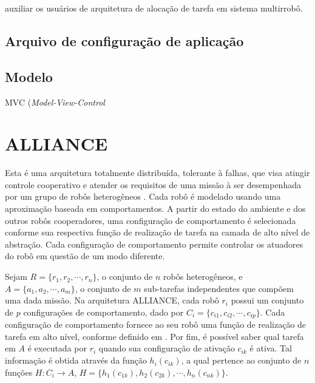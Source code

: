         auxiliar os usuários de arquitetura de alocação de tarefa em sistema multirrobô. 
        
        \subsection{Arquivo de configuração de aplicação}
        
        \subsection{Modelo}
        
        MVC (\textit{Model-View-Control}
    
        
        
        
        
        
        
        
        
        
        
        
        
        
        
        
    \section{ALLIANCE} \label{sec:alliance}
        Esta é uma arquitetura totalmente distribuída, tolerante à falhas, que visa atingir controle cooperativo e atender os requisitos de uma missão à ser desempenhada por um grupo de robôs heterogêneos \cite{ref:parker1998alliance}. Cada robô é modelado usando uma aproximação baseada em comportamentos. A partir do estado do ambiente e dos outros robôs cooperadores, uma configuração de comportamento é selecionada conforme sua respectiva função de realização de tarefa na camada de alto nível de abstração. Cada configuração de comportamento permite controlar os atuadores do robô em questão de um modo diferente.
        
        Sejam $R=\{r_1, r_2, \cdots, r_n\}$, o conjunto de $n$ robôs heterogêneos, e $A=\{a_1,a_2, \cdots,\allowbreak a_m\}$, o conjunto de $m$ sub-tarefas independentes que compõem uma dada missão. Na arquitetura ALLIANCE, cada robô $r_i$ possui um conjunto de $p$ configurações de comportamento, dado por $C_i=\{c_{i1}, c_{i2},\cdots, c_{ip}\}$. Cada configuração de comportamento fornece ao seu robô uma função de realização de tarefa em alto nível, conforme definido em \cite{ref:brooks1986robust}. Por fim, é possível saber qual tarefa em $A$ é executada por $r_i$ quando sua configuração de ativação $c_{ik}$ é ativa. Tal informação é obtida através da função $h_i(c_{ik})$, a qual pertence ao conjunto de $n$ funções $H : C_i \to A$, $H = \{h_1(c_{1k}),\allowbreak h_2(c_{2k}), \cdots, h_n(c_{nk})\}$.
        

